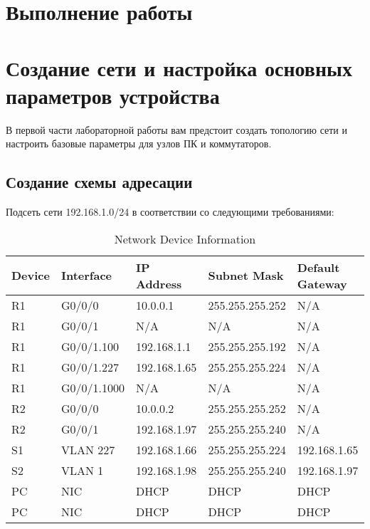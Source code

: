 \section*{\LARGE Выполнение работы}


\section{Создание сети и настройка основных параметров устройства}
В первой части лабораторной работы вам предстоит создать топологию сети и настроить базовые
параметры для узлов ПК и коммутаторов.

\subsection{Создание схемы адресации}
Подсеть сети 192.168.1.0/24 в соответствии со следующими требованиями:

\begin{table}[htbp]
    \centering
    \caption{Network Device Information}
    \label{tab:network_devices}
    \begin{tabular}{|l|l|l|l|l|}
        \hline
        \textbf{Device} & \textbf{Interface} & \textbf{IP Address}
        & \textbf{Subnet Mask} & \textbf{Default Gateway} \\ \hline
        R1 & G0/0/0 & 10.0.0.1 & 255.255.255.252 & N/A \\ \hline
        R1 & G0/0/1 & N/A & N/A & N/A \\ \hline
        R1 & G0/0/1.100 & 192.168.1.1 & 255.255.255.192 & N/A \\ \hline
        R1 & G0/0/1.227 & 192.168.1.65 & 255.255.255.224 & N/A \\ \hline
        R1 & G0/0/1.1000 & N/A & N/A & N/A \\ \hline
        R2 & G0/0/0 & 10.0.0.2 & 255.255.255.252 & N/A \\ \hline
        R2 & G0/0/1 & 192.168.1.97 & 255.255.255.240 & N/A \\ \hline
        S1 & VLAN 227 & 192.168.1.66 & 255.255.255.224 & 192.168.1.65 \\ \hline
        S2 & VLAN 1 & 192.168.1.98 & 255.255.255.240 & 192.168.1.97 \\ \hline
        PC & NIC & DHCP & DHCP & DHCP \\ \hline
        PC & NIC & DHCP & DHCP & DHCP \\ \hline
    \end{tabular}
\end{table}

